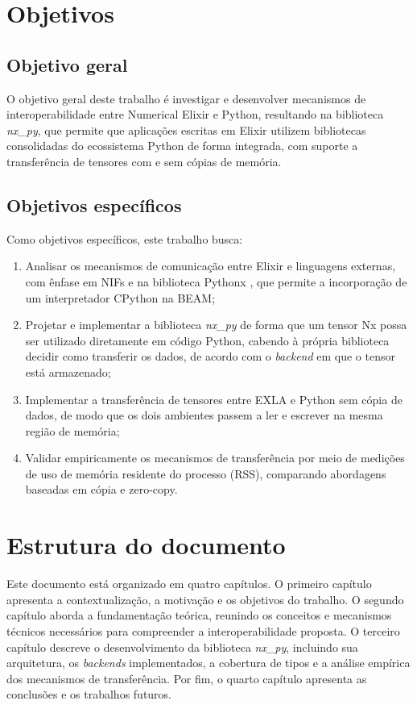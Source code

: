 \section{Objetivos}\label{sec:objetivos}

\subsection{Objetivo geral}\label{subsec:objetivo-geral}

O objetivo geral deste trabalho é investigar e desenvolver mecanismos de interoperabilidade entre Numerical Elixir e Python, resultando na biblioteca \textit{nx\_py}, que permite que aplicações escritas em Elixir utilizem bibliotecas consolidadas do ecossistema Python de forma integrada, com suporte a transferência de tensores com e sem cópias de memória.

\subsection{Objetivos específicos}\label{subsec:objetivos-especificos}

Como objetivos específicos, este trabalho busca:

\begin{enumerate}
    \item Analisar os mecanismos de comunicação entre Elixir e linguagens externas, com ênfase em \glspl{NIF} \citep{erlnif2024} e na biblioteca Pythonx \citep{pythonx2024}, que permite a incorporação de um interpretador CPython na \gls{BEAM};
    \item Projetar e implementar a biblioteca \textit{nx\_py} de forma que um tensor \gls{Nx} possa ser utilizado diretamente em código Python, cabendo à própria biblioteca decidir como transferir os dados, de acordo com o \textit{backend} em que o tensor está armazenado;
    \item Implementar a transferência de tensores entre \gls{EXLA} e Python sem cópia de dados, de modo que os dois ambientes passem a ler e escrever na mesma região de memória;
    \item Validar empiricamente os mecanismos de transferência por meio de medições de uso de memória residente do processo (\gls{RSS}), comparando abordagens baseadas em cópia e zero-copy.
\end{enumerate}

\section{Estrutura do documento}\label{sec:estrutura}

Este documento está organizado em quatro capítulos. O primeiro capítulo apresenta a contextualização, a motivação e os objetivos do trabalho. O segundo capítulo aborda a fundamentação teórica, reunindo os conceitos e mecanismos técnicos necessários para compreender a interoperabilidade proposta. O terceiro capítulo descreve o desenvolvimento da biblioteca \textit{nx\_py}, incluindo sua arquitetura, os \textit{backends} implementados, a cobertura de tipos e a análise empírica dos mecanismos de transferência. Por fim, o quarto capítulo apresenta as conclusões e os trabalhos futuros.
